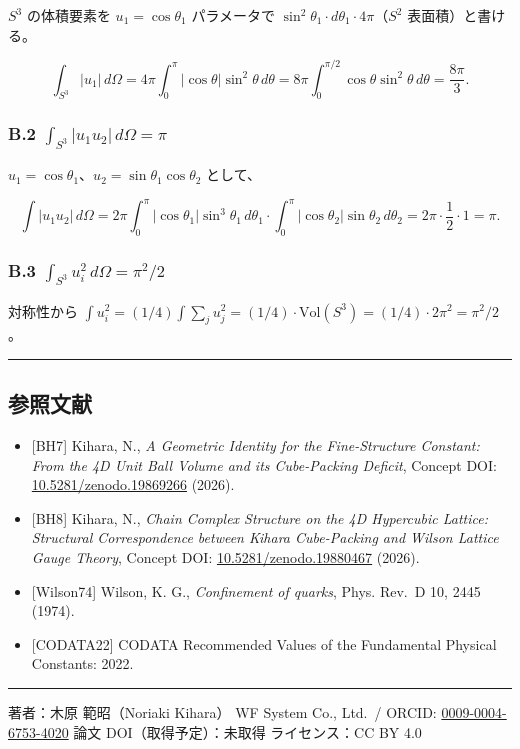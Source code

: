 \documentclass[
]{article}
\providecommand{\tightlist}{%
  \setlength{\itemsep}{0pt}\setlength{\parskip}{0pt}}
\begin{document}
\(S^3\) の体積要素を \(u_1 = \cos\theta_1\) パラメータで
\(\sin^2\theta_1 \cdot d\theta_1 \cdot 4\pi\)（\(S^2\)
表面積）と書ける。

\[\int_{S^3} |u_1| \, d\Omega = 4\pi \int_0^\pi |\cos\theta| \sin^2\theta \, d\theta = 8\pi \int_0^{\pi/2} \cos\theta \sin^2\theta \, d\theta = \frac{8\pi}{3}.\]

\subsubsection{\texorpdfstring{B.2
\(\int_{S^3} |u_1 u_2| \, d\Omega = \pi\)}{B.2 \textbackslash int\_\{S\^{}3\} \textbar u\_1 u\_2\textbar{} \textbackslash, d\textbackslash Omega = \textbackslash pi}}\label{b.2-int_s3-u_1-u_2-domega-pi}

\(u_1 = \cos\theta_1\)、\(u_2 = \sin\theta_1 \cos\theta_2\) として、

\[\int |u_1 u_2| \, d\Omega = 2\pi \int_0^\pi |\cos\theta_1| \sin^3\theta_1 \, d\theta_1 \cdot \int_0^\pi |\cos\theta_2| \sin\theta_2 \, d\theta_2 = 2\pi \cdot \frac{1}{2} \cdot 1 = \pi.\]

\subsubsection{\texorpdfstring{B.3
\(\int_{S^3} u_i^2 \, d\Omega = \pi^2/2\)}{B.3 \textbackslash int\_\{S\^{}3\} u\_i\^{}2 \textbackslash, d\textbackslash Omega = \textbackslash pi\^{}2/2}}\label{b.3-int_s3-u_i2-domega-pi22}

対称性から
\(\int u_i^2 = (1/4) \int \sum_j u_j^2 = (1/4) \cdot \text{Vol}(S^3) = (1/4) \cdot 2\pi^2 = \pi^2/2\)。

\begin{center}\rule{0.5\linewidth}{0.5pt}\end{center}

\subsection{参照文献}\label{ux53c2ux7167ux6587ux732e}

\begin{itemize}
\tightlist
\item
  {[}BH7{]} Kihara, N., \emph{A Geometric Identity for the
  Fine-Structure Constant: From the 4D Unit Ball Volume and its
  Cube-Packing Deficit}, Concept DOI:
  \href{https://doi.org/10.5281/zenodo.19869266}{10.5281/zenodo.19869266}
  (2026).
\item
  {[}BH8{]} Kihara, N., \emph{Chain Complex Structure on the 4D
  Hypercubic Lattice: Structural Correspondence between Kihara
  Cube-Packing and Wilson Lattice Gauge Theory}, Concept DOI:
  \href{https://doi.org/10.5281/zenodo.19880467}{10.5281/zenodo.19880467}
  (2026).
\item
  {[}Wilson74{]} Wilson, K. G., \emph{Confinement of quarks}, Phys.
  Rev.~D 10, 2445 (1974).
\item
  {[}CODATA22{]} CODATA Recommended Values of the Fundamental Physical
  Constants: 2022.
\end{itemize}

\begin{center}\rule{0.5\linewidth}{0.5pt}\end{center}

著者：木原 範昭（Noriaki Kihara） WF System Co., Ltd.~/ ORCID:
\href{https://orcid.org/0009-0004-6753-4020}{0009-0004-6753-4020} 論文
DOI（取得予定）：未取得 ライセンス：CC BY 4.0
\end{document}

